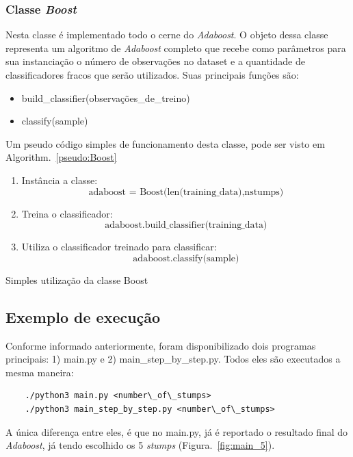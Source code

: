\subsubsection{Classe \emph{Boost}}
Nesta classe é implementado todo o cerne do \emph{Adaboost}. O objeto dessa classe representa um algoritmo de \emph{Adaboost} completo que recebe como parâmetros para sua instanciação o número de observações no dataset e a quantidade de classificadores fracos que serão utilizados. Suas principais funções são:
	\begin{itemize}
		\item build\_classifier(observações\_de\_treino)
		\item classify(sample)
	\end{itemize}

Um pseudo código simples de funcionamento desta classe, pode ser visto em Algorithm.~\ref{pseudo:Boost}

\begin{algorithm}[htb]
  \begin{enumerate}
    \item Instância a classe:
			\[
				\text{adaboost = Boost(len(training\_data),nstumps)}
			\]
    \item Treina o classificador:
			\[
			 	\text{adaboost.build\_classifier(training\_data)}
			\]
    \item Utiliza o classificador treinado para classificar:
			\[
			 	\text{adaboost.classify(sample)}
			\]
    \end{enumerate}
	\caption{Simples utilização da classe Boost}
	\label{pseudo:Boost}
\end{algorithm}




\subsection{Exemplo de execução}
Conforme informado anteriormente, foram disponibilizado dois programas principais: 1) main.py e 2) main\_step\_by\_step.py. Todos eles são executados a mesma maneira:

\begin{verbatim}
	./python3 main.py <number\_of\_stumps>
	./python3 main_step_by_step.py <number\_of\_stumps>
\end{verbatim}

A única diferença entre eles, é que no main.py, já é reportado o resultado final do \emph{Adaboost}, já tendo escolhido os 5 \emph{stumps} (Figura.~\ref{fig:main_5}).

